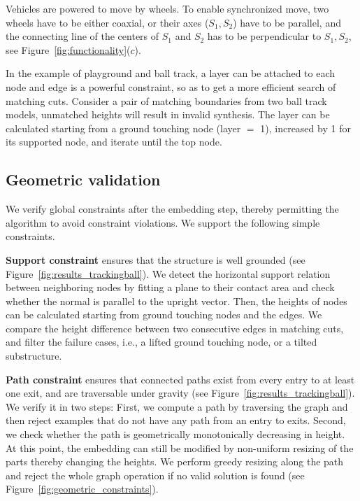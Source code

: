  Vehicles are powered to move by wheels. To enable synchronized move, two wheels have to be either coaxial, or their axes ($S_1, S_2$) have to be parallel, and the connecting line of the centers of $S_1$ and $S_2$ has to be perpendicular to $S_1, S_2$, see Figure~\ref{fig:functionality}($c$).

 In the example of playground and ball track, a layer can be attached to each node and edge is a powerful constraint, so as to get a more efficient search of matching cuts. Consider a pair of matching boundaries from two ball track models, unmatched heights will result in invalid synthesis. The layer can be calculated starting from a ground touching node (layer $=$ 1), increased by 1 for its supported node, and iterate until the top node.

\subsection{Geometric validation}

We verify global constraints after the embedding step, thereby permitting the algorithm to avoid constraint violations. We support the following simple constraints.

\noindent \textbf{Support constraint} ensures that the structure is well grounded (see Figure~\ref{fig:results_trackingball}). We detect the horizontal support relation between neighboring nodes by fitting a plane to their contact area and check whether the normal is parallel to the upright vector. Then, the heights of nodes can be calculated starting from ground touching nodes and the edges. We compare the height difference between two consecutive edges in matching cuts, and filter the failure cases, i.e., a lifted ground touching node, or a tilted substructure.

\noindent \textbf{Path constraint} ensures that connected paths exist from every entry to at least one exit, and are traversable under gravity (see Figure~\ref{fig:results_trackingball}). We verify it in two steps: First, we compute a path by traversing the graph and then reject examples that do not have any path from an entry to exits. Second, we check whether the path is geometrically monotonically decreasing in height. At this point, the embedding can still be modified by non-uniform resizing of the parts thereby changing the heights. We perform greedy resizing along the path and reject the whole graph operation if no valid solution is found (see Figure~\ref{fig:geometric_constraints}).


